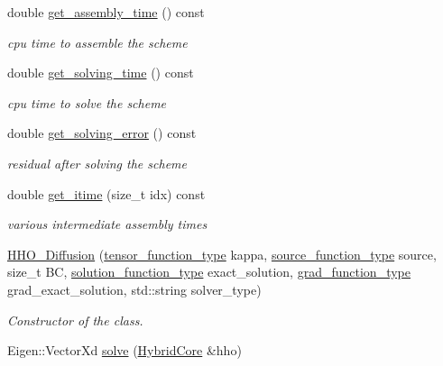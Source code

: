 \begin{DoxyCompactItemize}
double \hyperlink{group__HHO__Diffusion_ga4b67f061d06b1aea5a626792a2bddd1e}{get\+\_\+assembly\+\_\+time} () const
\begin{DoxyCompactList}\small\item\em cpu time to assemble the scheme \end{DoxyCompactList}\item 
double \hyperlink{group__HHO__Diffusion_ga0ba01c42bc116f962b6982b27e95b471}{get\+\_\+solving\+\_\+time} () const
\begin{DoxyCompactList}\small\item\em cpu time to solve the scheme \end{DoxyCompactList}\item 
double \hyperlink{group__HHO__Diffusion_gad53ffa4a52af7bf6803e28f36c7e3365}{get\+\_\+solving\+\_\+error} () const
\begin{DoxyCompactList}\small\item\em residual after solving the scheme \end{DoxyCompactList}\item 
double \hyperlink{group__HHO__Diffusion_ga43051dfce03a9f75c33903f1736f4e1a}{get\+\_\+itime} (size\+\_\+t idx) const
\begin{DoxyCompactList}\small\item\em various intermediate assembly times \end{DoxyCompactList}\item 
\hyperlink{classHArDCore2D_1_1HHO__Diffusion_a9ab2e2cdf0c77f60069f7572c587c4f1}{H\+H\+O\+\_\+\+Diffusion} (\hyperlink{classHArDCore2D_1_1HHO__Diffusion_acc4abb92b452d6407d45a87823fb47f9}{tensor\+\_\+function\+\_\+type} kappa, \hyperlink{classHArDCore2D_1_1HHO__Diffusion_ade095df766ff04bf09385a163136e5c0}{source\+\_\+function\+\_\+type} source, size\+\_\+t BC, \hyperlink{classHArDCore2D_1_1HHO__Diffusion_ac2ddc18a37be70e4767a9040fb6a09f6}{solution\+\_\+function\+\_\+type} exact\+\_\+solution, \hyperlink{classHArDCore2D_1_1HHO__Diffusion_a14797a72cc96ee5ea6fc45e4986d6a84}{grad\+\_\+function\+\_\+type} grad\+\_\+exact\+\_\+solution, std\+::string solver\+\_\+type)
\begin{DoxyCompactList}\small\item\em Constructor of the class. \end{DoxyCompactList}\item 
\mbox{\label{classHArDCore2D_1_1HHO__Diffusion_a1aebf22f19de92c115aed69ba394de88}} 
Eigen\+::\+Vector\+Xd \hyperlink{classHArDCore2D_1_1HHO__Diffusion_a1aebf22f19de92c115aed69ba394de88}{solve} (\hyperlink{classHArDCore2D_1_1HybridCore}{Hybrid\+Core} \&hho)

\end{DoxyCompactItemize}
